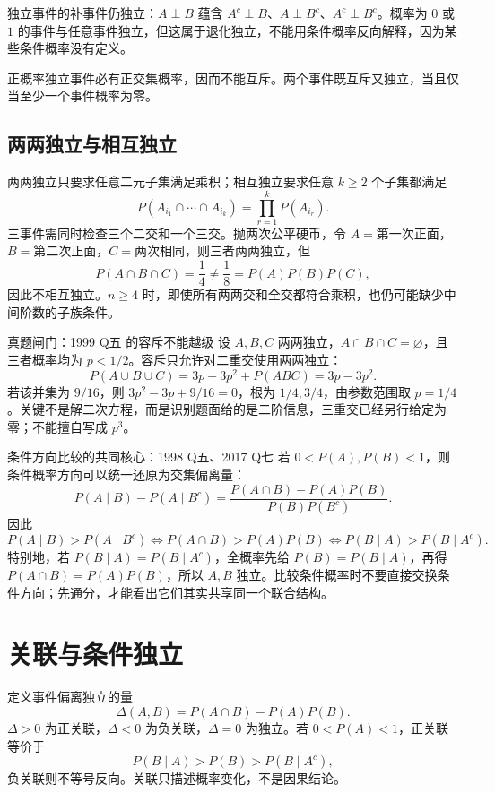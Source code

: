 \documentclass[11pt,a4paper]{ctexart}
\begin{document}
独立事件的补事件仍独立：$A\perp B$ 蕴含 $A^c\perp B$、$A\perp B^c$、$A^c\perp B^c$。概率为 $0$ 或 $1$ 的事件与任意事件独立，但这属于退化独立，不能用条件概率反向解释，因为某些条件概率没有定义。

正概率独立事件必有正交集概率，因而不能互斥。两个事件既互斥又独立，当且仅当至少一个事件概率为零。

\subsection{两两独立与相互独立}

两两独立只要求任意二元子集满足乘积；相互独立要求任意 $k\ge2$ 个子集都满足
\[
P(A_{i_1}\cap\cdots\cap A_{i_k})=\prod_{r=1}^{k}P(A_{i_r}).
\]
三事件需同时检查三个二交和一个三交。抛两次公平硬币，令 $A=$第一次正面，$B=$第二次正面，$C=$两次相同，则三者两两独立，但
\[
P(A\cap B\cap C)=\frac14\ne\frac18=P(A)P(B)P(C),
\]
因此不相互独立。$n\ge4$ 时，即使所有两两交和全交都符合乘积，也仍可能缺少中间阶数的子族条件。

\begin{examplebox}{真题闸门：1999 Q五 的容斥不能越级}
设 $A,B,C$ 两两独立，$A\cap B\cap C=\varnothing$，且三者概率均为 $p<1/2$。容斥只允许对二重交使用两两独立：
\[
P(A\cup B\cup C)=3p-3p^2+P(ABC)=3p-3p^2.
\]
若该并集为 $9/16$，则 $3p^2-3p+9/16=0$，根为 $1/4,3/4$，由参数范围取 $p=1/4$。关键不是解二次方程，而是识别题面给的是二阶信息，三重交已经另行给定为零；不能擅自写成 $p^3$。
\end{examplebox}

\begin{examplebox}{条件方向比较的共同核心：1998 Q五、2017 Q七}
若 $0<P(A),P(B)<1$，则条件概率方向可以统一还原为交集偏离量：
\[
P(A\mid B)-P(A\mid B^c)
=\frac{P(A\cap B)-P(A)P(B)}{P(B)P(B^c)}.
\]
因此
\[
P(A\mid B)>P(A\mid B^c)
\Longleftrightarrow P(A\cap B)>P(A)P(B)
\Longleftrightarrow P(B\mid A)>P(B\mid A^c).
\]
特别地，若 $P(B\mid A)=P(B\mid A^c)$，全概率先给 $P(B)=P(B\mid A)$，再得 $P(A\cap B)=P(A)P(B)$，所以 $A,B$ 独立。比较条件概率时不要直接交换条件方向；先通分，才能看出它们其实共享同一个联合结构。
\end{examplebox}

\section{关联与条件独立}

定义事件偏离独立的量
\[
\Delta(A,B)=P(A\cap B)-P(A)P(B).
\]
$\Delta>0$ 为正关联，$\Delta<0$ 为负关联，$\Delta=0$ 为独立。若 $0<P(A)<1$，正关联等价于
\[
P(B\mid A)>P(B)>P(B\mid A^c),
\]
负关联则不等号反向。关联只描述概率变化，不是因果结论。
\end{document}
